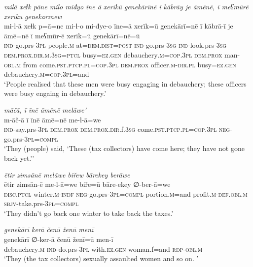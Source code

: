 \ea \label{BP.45}
\textit{milā xeɫk pāne milo miđyo īne ā xerīkū genekārīnē ī kābrāy je āmēnē, ī meʕmūrē xerīkū genekārīnēw} \\ 
\gll mi-l-ā xeɫk p=ā=ne mi-l-o mi-đye-o īne=ā xerīk=ū genekārī=nē ī kābrā-ī je āmē=nē ī meʕmūr-ē xerīk=ū genekārī=nē=ū \\ 
 \textsc{ind-}go.prs\textsc{-3pl} people\textsc{.m} at=\textsc{dem.dist}\textsc{=\textsc{post}} \textsc{ind-}go.prs\textsc{-3sg} \textsc{ind-}look.prs\textsc{-3sg} \textsc{dem.prox}\textsc{.dir}\textsc{.m}\textsc{.3sg}=\textsc{ptcl} busy\textsc{=ez.gen} debauchery\textsc{.m}\textsc{=cop}\textsc{.3pl} \textsc{dem.prox} man\textsc{-obl}\textsc{.m} from come\textsc{.pst}\textsc{.ptcp}\textsc{.pl}\textsc{=cop}\textsc{.3pl} \textsc{dem.prox} officer\textsc{.m}\textsc{-dir}\textsc{.pl} busy\textsc{=ez.gen} debauchery\textsc{.m}\textsc{=cop}\textsc{.3pl}=and \\ 
\glt `People realised that these men were busy engaging in debauchery; these officers were busy engaing in debauchery.'
\z 
 
\ea \label{BP.47}
\textit{māčā, ī īnē āmēnē melāwe’} \\ 
\gll m-āč-ā ī īnē āmē=nē me-l-ā=we \\ 
 \textsc{ind-}say.prs\textsc{-3pl} \textsc{dem.prox} \textsc{dem.prox}\textsc{.dir}.f\textsc{.3sg} come\textsc{.pst}\textsc{.ptcp}\textsc{.pl}\textsc{=cop}\textsc{.3pl} \textsc{neg-}go.prs\textsc{-3pl}\textsc{=compl} \\ 
\glt `They (people) said, ‘These (tax collectors) have come here; they have not gone back yet.’'
\z 
 
\ea \label{BP.48}
\textit{ētir zimsānē melāwe biřew bārekey berāwe} \\ 
\gll ētir zimsān-ē me-l-ā=we biře=ū bāre-ekey ∅-ber-ā=we \\ 
 \textsc{disc.ptcl} winter\textsc{.m}\textsc{-indf} \textsc{neg-}go.prs\textsc{-3pl}\textsc{=compl} portion\textsc{.m}=and profit\textsc{.m}\textsc{-def}\textsc{.obl}\textsc{.m} \textsc{sbjv-}take.prs\textsc{-3pl}\textsc{=compl} \\ 
\glt `They didn’t go back one winter to take back the taxes.'
\z 
 
\ea \label{BP.49}
\textit{genekārī kerā čenū ženū menī} \\ 
\gll genekārī ∅-ker-ā čenū ženī=ū men-ī \\ 
 debauchery\textsc{.m} \textsc{ind-}do.prs\textsc{-3pl} with\textsc{.ez.gen} woman.f=and \textsc{rdp}\textsc{-obl}\textsc{.m} \\ 
\glt `They (the tax collectors) sexually assaulted women and so on. '
\z 
 
